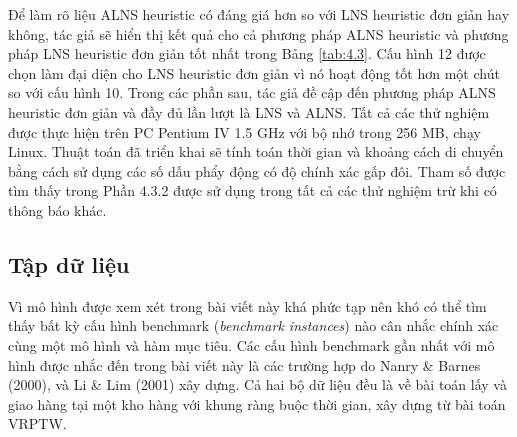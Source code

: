 Để làm rõ liệu ALNS heuristic có đáng giá hơn so với LNS heuristic đơn giản hay không, tác giả sẽ hiển thị kết quả cho cả phương pháp ALNS heuristic và phương pháp LNS heuristic đơn giản tốt nhất trong Bảng \ref{tab:4.3}. Cấu hình 12 được chọn làm đại diện cho LNS heuristic đơn giản vì nó hoạt động tốt hơn một chút so với cấu hình 10. Trong các phần sau, tác giả đề cập đến phương pháp ALNS heuristic đơn giản và đầy đủ lần lượt là LNS và ALNS.
Tất cả các thử nghiệm được thực hiện trên PC Pentium IV 1.5 GHz với bộ nhớ trong 256 MB, chạy Linux. Thuật toán đã triển khai sẽ tính toán thời gian và khoảng cách di chuyển bằng cách sử dụng các số dấu phẩy động có độ chính xác gấp đôi. Tham số được tìm thấy trong Phần 4.3.2 được sử dụng trong tất cả các thử nghiệm trừ khi có thông báo khác.

\subsection{Tập dữ liệu}
Vì mô hình được xem xét trong bài viết này khá phức tạp nên khó có thể tìm thấy bất kỳ cấu hình benchmark (\textit{benchmark instances}) nào cân nhắc chính xác cùng một mô hình và hàm mục tiêu. Các cấu hình benchmark gần nhất với mô hình được nhắc đến trong bài viết này là các trường hợp do Nanry \& Barnes (2000), và Li \& Lim (2001) xây dựng. Cả hai bộ dữ liệu đều là về bài toán lấy và giao hàng tại một kho hàng với khung ràng buộc thời gian, xây dựng từ bài toán VRPTW.


